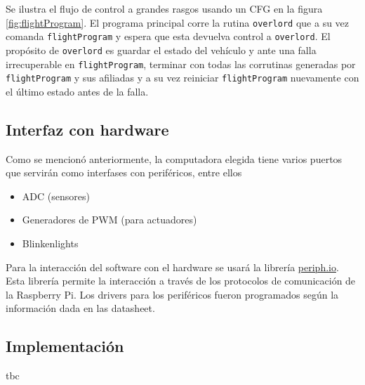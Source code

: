 Se ilustra el flujo de control a grandes rasgos usando un CFG en la figura \ref{fig:flightProgram}. El programa principal corre la rutina \texttt{overlord} que a su vez comanda \texttt{flightProgram} y espera que esta devuelva control a \texttt{overlord}. El propósito de \texttt{overlord} es guardar el estado del vehículo y ante una falla irrecuperable en \texttt{flightProgram}, terminar con todas las corrutinas generadas por \texttt{flightProgram} y sus afiliadas y a su vez reiniciar \texttt{flightProgram} nuevamente con el último estado antes de la falla.


\subsection{Interfaz con hardware}

Como se mencionó anteriormente, la computadora elegida tiene varios puertos que servirán como interfases con periféricos, entre ellos 

\begin{itemize}
    \item ADC (sensores)
    \item Generadores de PWM (para actuadores)
    \item Blinkenlights
\end{itemize}

Para la interacción del software con el hardware se usará la librería \href{https://periph.io}{periph.io}. Esta librería permite la interacción a través de los protocolos de comunicación de la Raspberry Pi. Los drivers para los periféricos fueron programados según la información dada en las datasheet.

\subsection{Implementación}

tbc

